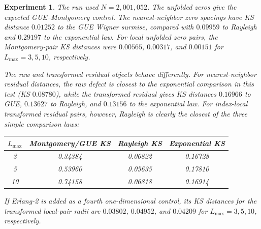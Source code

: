 \documentclass[12pt]{article}
\numberwithin{equation}{section}
\newtheorem{experiment}[theorem]{Experiment}
\begin{document}
\begin{experiment}
\label{exp:odlyzko_style_control}
The run used \(N=2,001,052\).  The unfolded zeros give the expected GUE--Montgomery control.  The nearest-neighbor zero spacings have KS distance \(0.01252\) to the GUE Wigner surmise, compared with \(0.09959\) to Rayleigh and \(0.29197\) to the exponential law.  For local unfolded zero pairs, the Montgomery-pair KS distances were \(0.00565\), \(0.00317\), and \(0.00151\) for \(L_{\max}=3,5,10\), respectively.

The raw and transformed residual objects behave differently.  For nearest-neighbor residual distances, the raw defect is closest to the exponential comparison in this test (KS \(0.08780\)), while the transformed residual gives KS distances \(0.16966\) to GUE, \(0.13627\) to Rayleigh, and \(0.13156\) to the exponential law.  For index-local transformed residual pairs, however, Rayleigh is clearly the closest of the three simple comparison laws:
\begin{center}
\begin{tabular}{c|ccc}
\toprule
\(L_{\max}\) & Montgomery/GUE KS & Rayleigh KS & Exponential KS \\
\midrule
3  & 0.34384 & 0.06822 & 0.16728 \\
5  & 0.53960 & 0.05635 & 0.17810 \\
10 & 0.74158 & 0.06818 & 0.16914 \\
\bottomrule
\end{tabular}
\end{center}
If Erlang-2 is added as a fourth one-dimensional control, its KS distances for the transformed local-pair radii are \(0.03802\), \(0.04952\), and \(0.04209\) for \(L_{\max}=3,5,10\), respectively.
\end{experiment}
\end{document}
